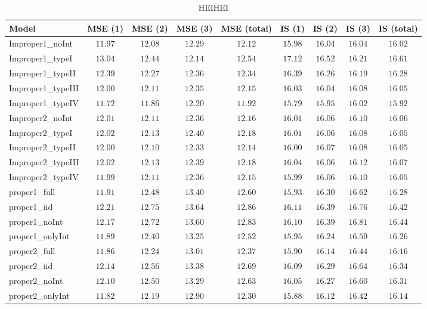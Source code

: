 \begin{table}

\caption{\label{tab:model-choice-sc12}HEIHEI}
\centering
\begin{tabular}{lcccccccc}
\hline
Model  & MSE (1) & MSE (2) & MSE (3) & MSE (total) & IS (1) & IS (2) & IS (3) & \multicolumn{1}{c}{IS (total)} \\ 
\hline
Improper1_noInt  & $11.97$ & $12.08$ & $12.29$ & $12.12$ & $15.98$ & $16.04$ & $16.04$ & $16.02$ \\
Improper1_typeI  & $13.04$ & $12.44$ & $12.14$ & $12.54$ & $17.12$ & $16.52$ & $16.21$ & $16.61$ \\
Improper1_typeII  & $12.39$ & $12.27$ & $12.36$ & $12.34$ & $16.39$ & $16.26$ & $16.19$ & $16.28$ \\
Improper1_typeIII  & $12.00$ & $12.11$ & $12.35$ & $12.15$ & $16.03$ & $16.04$ & $16.08$ & $16.05$ \\
Improper1_typeIV  & $11.72$ & $11.86$ & $12.20$ & $11.92$ & $15.79$ & $15.95$ & $16.02$ & $15.92$ \\
Improper2_noInt  & $12.01$ & $12.11$ & $12.36$ & $12.16$ & $16.01$ & $16.06$ & $16.10$ & $16.06$ \\
Improper2_typeI  & $12.02$ & $12.13$ & $12.40$ & $12.18$ & $16.01$ & $16.06$ & $16.08$ & $16.05$ \\
Improper2_typeII  & $12.00$ & $12.10$ & $12.33$ & $12.14$ & $16.00$ & $16.07$ & $16.08$ & $16.05$ \\
Improper2_typeIII  & $12.02$ & $12.13$ & $12.39$ & $12.18$ & $16.04$ & $16.06$ & $16.12$ & $16.07$ \\
Improper2_typeIV  & $11.99$ & $12.11$ & $12.36$ & $12.15$ & $15.99$ & $16.06$ & $16.10$ & $16.05$ \\
proper1_full  & $11.91$ & $12.48$ & $13.40$ & $12.60$ & $15.93$ & $16.30$ & $16.62$ & $16.28$ \\
proper1_iid  & $12.21$ & $12.75$ & $13.64$ & $12.86$ & $16.11$ & $16.39$ & $16.76$ & $16.42$ \\
proper1_noInt  & $12.17$ & $12.72$ & $13.60$ & $12.83$ & $16.10$ & $16.39$ & $16.81$ & $16.44$ \\
proper1_onlyInt  & $11.89$ & $12.40$ & $13.25$ & $12.52$ & $15.95$ & $16.24$ & $16.59$ & $16.26$ \\
proper2_full  & $11.86$ & $12.24$ & $13.01$ & $12.37$ & $15.90$ & $16.14$ & $16.44$ & $16.16$ \\
proper2_iid  & $12.14$ & $12.56$ & $13.38$ & $12.69$ & $16.09$ & $16.29$ & $16.64$ & $16.34$ \\
proper2_noInt  & $12.10$ & $12.50$ & $13.29$ & $12.63$ & $16.05$ & $16.27$ & $16.60$ & $16.31$ \\
proper2_onlyInt  & $11.82$ & $12.19$ & $12.90$ & $12.30$ & $15.88$ & $16.12$ & $16.42$ & $16.14$ \\
\hline 
\end{tabular}


\end{table}